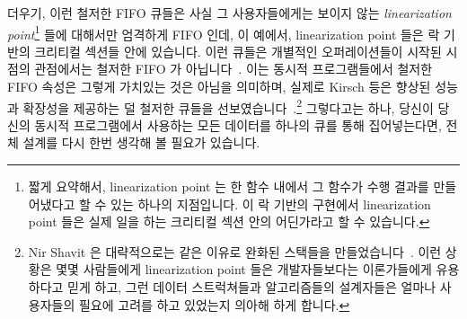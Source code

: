 더우기, 이런 철저한 FIFO 큐들은 사실 그 사용자들에게는 보이지 않는
\emph{linearization point}\footnote{
	짧게 요약해서, linearization point 는 한 함수 내에서 그 함수가 수행
	결과를 만들어냈다고 할 수 있는 하나의 지점입니다.
	이 락 기반의 구현에서 linearization point 들은 실제 일을 하는 크리티컬
	섹션 안의 어딘가라고 할 수 있습니다.}
들에 대해서만 엄격하게 FIFO 인데, 이 예에서, linearization point 들은 락 기반의
크리티컬 섹션들 안에 있습니다.
이런 큐들은 개별적인 오퍼레이션들이 시작된 시점의 관점에서는 철저한 FIFO 가
아닙니다~\cite{AndreasHaas2012FIFOisnt}.
이는 동시적 프로그램들에서 철저한 FIFO 속성은 그렇게 가치있는 것은 아님을
의미하며, 실제로 Kirsch 등은 향상된 성능과 확장성을 제공하는 덜 철저한 큐들을
선보였습니다~\cite{ChristophMKirsch2012FIFOisntTR}.\footnote{
	Nir Shavit 은 대략적으로는 같은 이유로 완화된 스택들을
	만들었습니다~\cite{Shavit:2011:DSM:1897852.1897873}.
	이런 상황은 몇몇 사람들에게 linearization point 들은 개발자들보다는
	이론가들에게 유용하다고 믿게 하고, 그런 데이터 스트럭쳐들과
	알고리즘들의 설계자들은 얼마나 사용자들의 필요에 고려를 하고 있었는지
	의아해 하게 합니다.}
그렇다고는 하나, 당신이 당신의 동시적 프로그램에서 사용하는 모든 데이터를
하나의 큐를 통해 집어넣는다면, 전체 설계를 다시 한번 생각해 볼 필요가 있습니다.

